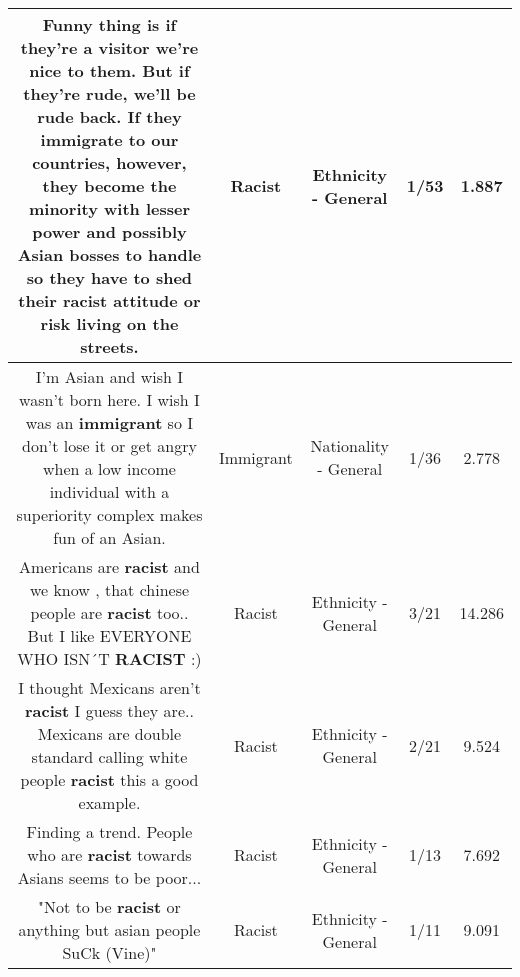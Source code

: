 \documentclass[11pt]{article}
\newlength\mylength
\begin{document}
\begin{center}
\begin{longtable}{|C{.65\mylength}|C{.30\mylength}|C{.12\mylength}|C{.12\mylength}|C{.12\mylength}|}
  \small Funny thing is if they're a visitor we're nice to them. But if they're rude, we'll be rude back. If they immigrate to our countries, however, they become the minority with lesser power and possibly Asian bosses to handle so they have to shed their \textbf{racist} attitude or risk living on the streets.\normalsize   & Racist & Ethnicity - General & 1/53 & 1.887 \\  \hline
  \small I'm Asian and wish I wasn't born here. I wish I was an \textbf{immigrant} so I don't lose it or get angry when a low income individual with a superiority complex makes fun of an Asian.\normalsize   & Immigrant & Nationality - General & 1/36 & 2.778 \\  \hline
  \small Americans are \textbf{racist} and we know , that chinese people are \textbf{racist} too.. But I like EVERYONE WHO ISN´T \textbf{RACIST} :)\normalsize   & Racist & Ethnicity - General & 3/21 & 14.286 \\  \hline
  \small I thought Mexicans aren't \textbf{racist} I guess they are.. Mexicans are double standard calling white people \textbf{racist} this a good example.\normalsize   & Racist & Ethnicity - General & 2/21 & 9.524 \\  \hline
  \small Finding a trend. People who are \textbf{racist} towards Asians seems to be poor...\normalsize   & Racist & Ethnicity - General & 1/13 & 7.692 \\  \hline
  \small "Not to be \textbf{racist} or anything but asian people SuCk (Vine)"\normalsize   & Racist & Ethnicity - General & 1/11 & 9.091 \\  \hline

\end{longtable}
\end{center}
\end{document}
